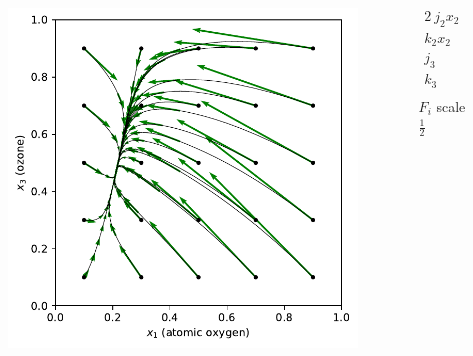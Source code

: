 \begin{columns}
\begin{column}{0.65\textwidth}
\vspace{-0.35in}
\begin{figure}
\includegraphics[scale=0.65]{../plots/chapman_1935.pdf}
\end{figure}
\end{column}
\begin{column}{0.35\textwidth}
\vspace{-0.35in}
\begin{align*}
2 \ j_2 x_2 &= 0.1 \\
k_2 x_2 &= 0.9 \\
j_3 &= 0.3 \\
k_3 &= 0.5 \\
\end{align*}
\hspace{0.4in} $F_i$ scale $\frac{1}{2}$
\end{column}
\end{columns}

